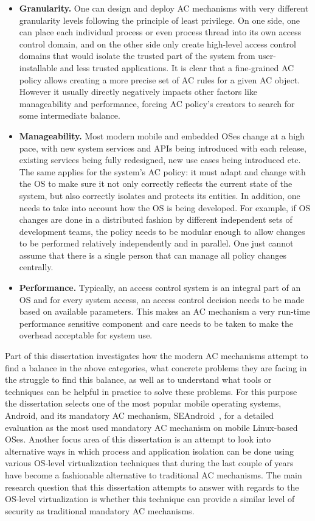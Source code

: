 \begin{itemize}
	\item \textbf{Granularity.} One can design and deploy AC mechanisms with very different granularity levels following the principle of least privilege. On one side, one can place each individual process or even process thread into its own access control domain, and on the other side only create high-level access control domains that would isolate the trusted part of the system from user-installable and less trusted applications. It is clear that a fine-grained AC policy allows creating a more precise set of AC rules for a given AC object. However it usually directly negatively impacts other factors like manageability and performance, forcing AC policy's creators to search for some intermediate balance.
	\item \textbf{Manageability.} Most modern mobile and embedded OSes change at a high pace, with new system services and APIs being introduced with each release, existing services being fully redesigned, new use cases being introduced etc. The same applies for the system's AC policy: it must adapt and change with the OS to make sure it not only correctly reflects the current state of the system, but also correctly isolates and protects its entities. In addition, one needs to take into account how the OS is being developed. For example, if OS changes are done in a distributed fashion by different independent sets of development teams, the policy needs to be modular enough to allow changes to be performed relatively independently and in parallel. One just cannot assume that there is a single person that can manage all policy changes centrally.  
	\item \textbf{Performance.} Typically, an access control system is an integral part of an OS and for every system access, an access control decision needs to be made based on available parameters. This makes an AC mechanism a very run-time performance sensitive component and care needs to be taken to make the overhead acceptable for system use. 
\end{itemize}

Part of this dissertation investigates how the modern AC mechanisms attempt to find a balance in the above categories, what concrete problems they are facing in the struggle to find this balance, as well as to understand what tools or techniques can be helpful in practice to solve these problems. For this purpose the dissertation selects one of the most popular mobile operating systems, Android, and its mandatory AC mechanism, SEAndroid~\cite{smalley12}, for a detailed evaluation as the most used mandatory AC mechanism on mobile Linux-based OSes. Another focus area of this dissertation is an attempt to look into alternative ways in which process and application isolation can be done using various OS-level virtualization  techniques that during the last couple of years have become a fashionable alternative to traditional AC mechanisms. The main research question that this dissertation attempts to answer with regards to the OS-level virtualization is whether this technique can provide a similar level of security as traditional mandatory AC mechanisms. 


